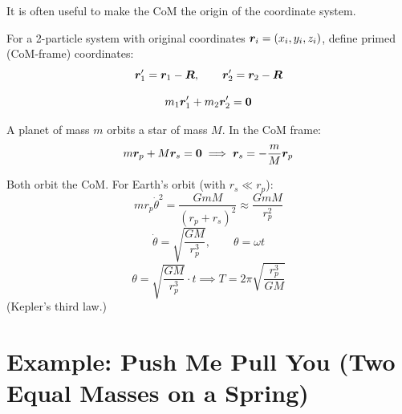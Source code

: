 \begin{fact}
It is often useful to make the CoM the origin of the coordinate system.
\end{fact}

For a 2-particle system with original coordinates $\bm{r}_i = (x_i, y_i, z_i)$, define primed (CoM-frame) coordinates:
\[
    \lvect{r}_1' = \lvect{r}_1 - \vect{R}, \qquad \lvect{r}_2' = \lvect{r}_2 - \vect{R}
\]

\begin{fact}
    \[
        m_1\lvect{r}_1' + m_2\lvect{r}_2' = \vect{0}
    \]
\end{fact}

\begin{example}[Exoplanets]
A planet of mass $m$ orbits a star of mass $M$. In the CoM frame:
\[
    m\lvect{r}_p + M\lvect{r}_s = \vect{0} \implies \lvect{r}_s = -\frac{m}{M}\lvect{r}_p
\]

Both orbit the CoM. For Earth's orbit (with $r_s \ll r_p$):
\[
    mr_p\dot{\theta}^2 = \frac{GmM}{(r_p + r_s)^2} \approx \frac{GmM}{r_p^2}
\]
\[
    \dot{\theta} = \sqrt{\frac{GM}{r_p^3}}, \qquad \theta = \omega t
\]
\[
    \theta = \sqrt{\frac{GM}{r_p^3}}\cdot t \implies T = 2\pi\sqrt{\frac{r_p^3}{GM}}
\]
(Kepler's third law.)
\end{example}

\section{Example: Push Me Pull You (Two Equal Masses on a Spring)}

